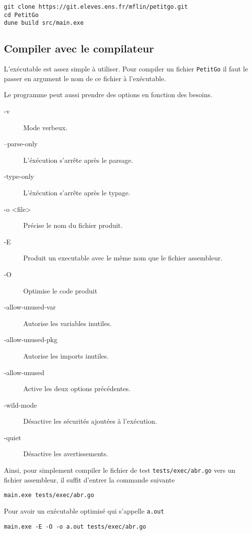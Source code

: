\documentclass{article}
\begin{document}
\begin{verbatim}
git clone https://git.eleves.ens.fr/mflin/petitgo.git
cd PetitGo
dune build src/main.exe
\end{verbatim}

\subsection{Compiler avec le compilateur\label{sec:exec}}

L'exécutable est assez simple à utiliser. Pour compiler un fichier \texttt{PetitGo} il faut le passer en argument le nom de ce fichier à l'exécutable.

Le programme peut aussi prendre des options en fonction des besoins.

\begin{description}
\item[-v] Mode verbeux.
\item[--\-parse-only] L'éxécution s'arrête après le parsage.
\item[-\-type-only] L'éxécution s'arrête après le typage.
\item[-o <file>] Précise le nom du fichier produit.
\item[-E] Produit un executable avec le même nom que le fichier assembleur.
\item[-O] Optimise le code produit
\item[-\-allow-unused-var] Autorise les variables inutiles.
\item[-\-allow-unused-pkg] Autorise les imports inutiles.
\item[-\-allow-unused] Active les deux options précédentes.
\item[-\-wild-mode] Désactive les sécurités ajoutées à l'exécution.
\item[-\-quiet] Désactive les avertissements.
\end{description}

Ainsi, pour simplement compiler le fichier de test \texttt{tests/exec/abr.go} vers un fichier assembleur, il suffit d'entrer la commande suivante

\begin{verbatim}
main.exe tests/exec/abr.go
\end{verbatim}

Pour avoir un exécutable optimisé qui s'appelle \texttt{a.out}

\begin{verbatim}
main.exe -E -O -o a.out tests/exec/abr.go
\end{verbatim}
\end{document}
